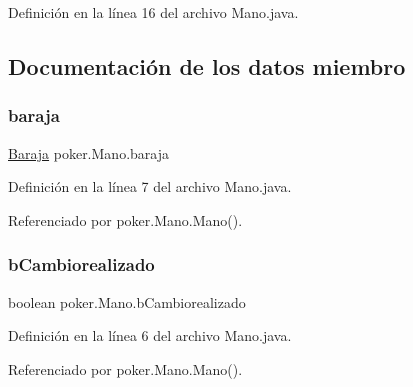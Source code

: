 Definición en la línea 16 del archivo Mano.\+java.


\begin{DoxyCode}{0}

\end{DoxyCode}


\subsection{Documentación de los datos miembro}
\mbox{\label{classpoker_1_1Mano_a9fd3c2334c2346b20e9e881b370fb564}} 
\subsubsection{\texorpdfstring{baraja}{baraja}}
{\footnotesize\ttfamily \mbox{\hyperlink{classpoker_1_1Baraja}{Baraja}} poker.\+Mano.\+baraja\hspace{0.3cm}{\ttfamily [private]}}



Definición en la línea 7 del archivo Mano.\+java.



Referenciado por poker.\+Mano.\+Mano().

\mbox{\label{classpoker_1_1Mano_ac3ccca1fe77bcb279ad4f0b7547b643d}} 
\subsubsection{\texorpdfstring{bCambiorealizado}{bCambiorealizado}}
{\footnotesize\ttfamily boolean poker.\+Mano.\+b\+Cambiorealizado\hspace{0.3cm}{\ttfamily [private]}}



Definición en la línea 6 del archivo Mano.\+java.



Referenciado por poker.\+Mano.\+Mano().

\mbox{\label{classpoker_1_1Mano_ae6e107ad79d163a4c45afc6274d36d9e}} 
